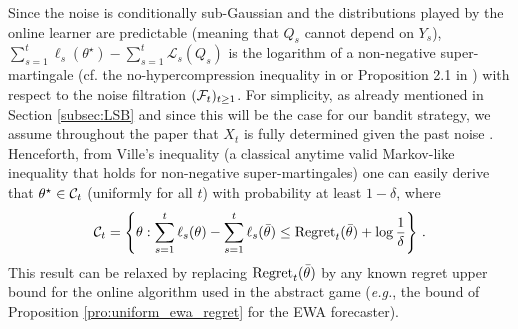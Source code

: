 Since the noise is conditionally sub-Gaussian and the distributions played by the online learner are predictable (meaning that $Q_s$ cannot depend on $Y_s$), $\sum_{s=1}^t\ell_s(\theta^{\star}) - \sum_{s=1}^{t}\mathcal{L}_s(Q_s)$ is the logarithm of a non-negative super-martingale (cf. the no-hypercompression
inequality in \citealp{grunwald2007minimum} or Proposition 2.1 in \citealp{clerico2025confidence}) with respect to the noise filtration $(\mathcal{F}_t)_{t\geq 1}$. For simplicity, as already mentioned in Section \ref{subsec:LSB} and since this will be the case for our bandit strategy, we assume throughout the paper that $X_t$ is fully determined given the past noise . Henceforth, from Ville's inequality (a classical anytime valid Markov-like inequality that holds for non-negative super-martingales) one can easily derive that $\theta^\star\in\mathcal{C}_t$ (uniformly for all $t$) with probability at least $1-\delta$, where
$$\mathcal{C}_t = \left\{\theta : \sum_{s=1}^{t}\ell_s(\theta) - \sum_{s=1}^{t}\ell_s(\bar{\theta}) \leq \mathrm{Regret}_t(\bar{\theta}) + \log\frac{1}{\delta}\right\}\,.$$
This result can be relaxed by replacing $ \mathrm{Regret}_t(\bar{\theta})$ by any known regret upper bound for the online algorithm used in the abstract game (\emph{e.g.}, the bound of Proposition \ref{pro:uniform_ewa_regret} for the EWA forecaster). 







